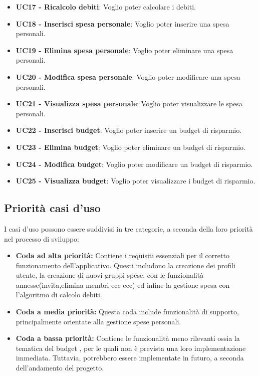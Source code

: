 \begin{itemize}
    \item \textbf{UC17 - Ricalcolo debiti}: Voglio poter calcolare i debiti.
    \item \textbf{UC18 - Inserisci spesa personale}: Voglio poter inserire una spesa personali.
    \item \textbf{UC19 - Elimina spesa personale}: Voglio poter eliminare una spesa personali.
    \item \textbf{UC20 - Modifica spesa personale}: Voglio poter modificare una spesa personali.
    \item \textbf{UC21 - Visualizza spesa personale}: Voglio poter visualizzare le spesa personali.
    \item \textbf{UC22 - Inserisci budget}: Voglio poter inserire un budget di risparmio.
    \item \textbf{UC23 - Elimina budget}: Voglio poter eliminare un budget di risparmio.
    \item \textbf{UC24 - Modifica budget}: Voglio poter modificare un budget di risparmio.
    \item \textbf{UC25 - Visualizza budget}: Voglio poter visualizzare i budget di risparmio.
\end{itemize}

\subsection{Priorità casi d'uso}
    I casi d'uso possono essere suddivisi in tre categorie, a seconda della loro priorità nel processo di sviluppo:
    \begin{itemize}
        \item \textbf{Coda ad alta priorità:} 
        Contiene i requisiti essenziali per il corretto funzionamento dell'applicativo. Questi includono la creazione dei profili utente, la creazione di nuovi gruppi spese, con le funzionalità annesse(invita,elimina membri ecc ecc) ed infine la gestione spesa con l'algoritmo di calcolo debiti.
    
        \item \textbf{Coda a media priorità:} 
        Questa coda include funzionalità di supporto, principalmente orientate alla gestione spese personali.
    
        \item \textbf{Coda a bassa priorità:} 
        Contiene le funzionalità meno rilevanti ossia la tematica del budget , per le quali non è prevista una loro implementazione immediata. Tuttavia, potrebbero essere implementate in futuro, a seconda dell'andamento del progetto.
    \end{itemize}

